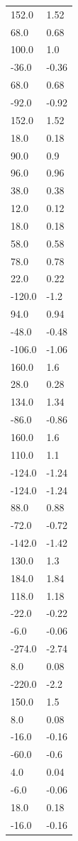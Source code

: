 \begin{longtable}{ll}
152.0 & 1.52 \\
68.0 & 0.68 \\
100.0 & 1.0 \\
-36.0 & -0.36 \\
68.0 & 0.68 \\
-92.0 & -0.92 \\
152.0 & 1.52 \\
18.0 & 0.18 \\
90.0 & 0.9 \\
96.0 & 0.96 \\
38.0 & 0.38 \\
12.0 & 0.12 \\
18.0 & 0.18 \\
58.0 & 0.58 \\
78.0 & 0.78 \\
22.0 & 0.22 \\
-120.0 & -1.2 \\
94.0 & 0.94 \\
-48.0 & -0.48 \\
-106.0 & -1.06 \\
160.0 & 1.6 \\
28.0 & 0.28 \\
134.0 & 1.34 \\
-86.0 & -0.86 \\
160.0 & 1.6 \\
110.0 & 1.1 \\
-124.0 & -1.24 \\
-124.0 & -1.24 \\
88.0 & 0.88 \\
-72.0 & -0.72 \\
-142.0 & -1.42 \\
130.0 & 1.3 \\
184.0 & 1.84 \\
118.0 & 1.18 \\
-22.0 & -0.22 \\
-6.0 & -0.06 \\
-274.0 & -2.74 \\
8.0 & 0.08 \\
-220.0 & -2.2 \\
150.0 & 1.5 \\
8.0 & 0.08 \\
-16.0 & -0.16 \\
-60.0 & -0.6 \\
4.0 & 0.04 \\
-6.0 & -0.06 \\
18.0 & 0.18 \\
-16.0 & -0.16 \\

\end{longtable}
